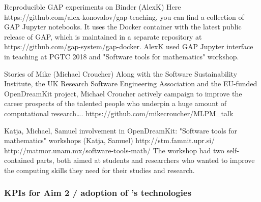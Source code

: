 \begin{Aim 1}
               Reproducible GAP experiments on Binder (AlexK)
Here https://github.com/alex-konovalov/gap-teaching, you can find a collection of GAP Jupyter notebooks. It uses the Docker container with the latest public release of GAP, which is maintained in a separate repository at https://github.com/gap-system/gap-docker.
AlexK used GAP Jupyter interface in teaching at PGTC 2018 and "Software tools for mathematics" workshop.

             Stories of Mike (Michael Croucher)
Along with the Software Sustainability Institute, the UK Research Software Engineering Association and the EU-funded OpenDreamKit project, Michael Croucher actively campaign to improve the career prospects of the talented people who underpin a huge amount of computational research…. https://github.com/mikecroucher/MLPM_talk

             Katja, Michael, Samuel involvement in OpenDreamKit: "Software tools for mathematics" workshops (Katja, Samuel)
http://stm.famnit.upr.si/
http://matmor.unam.mx/software-tools-math/
The workshop had two self-contained parts, both aimed at students and researchers who wanted to improve the computing skills they need for their studies and research.
                                             

\subsubsection{KPIs for Aim 2 / adoption of \ODK's technologies}

\end{Aim 1}
